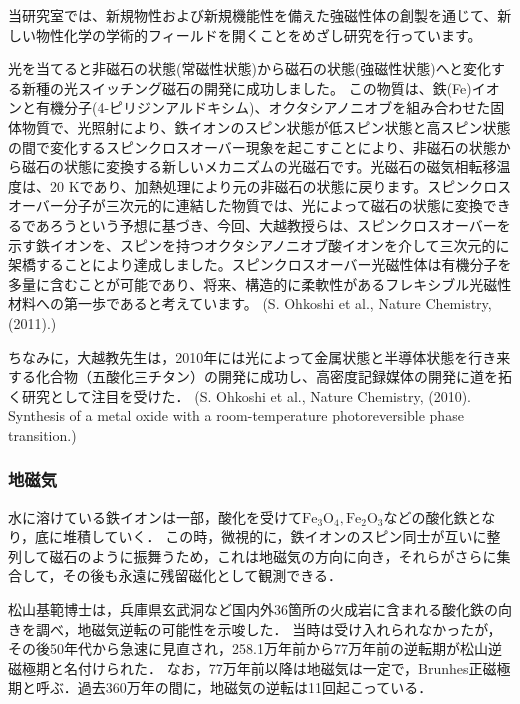 \documentclass[uplatex, dvipdfmx]{jsreport}
\begin{document}
\begin{example}[大越慎一研究室]
    当研究室では、新規物性および新規機能性を備えた強磁性体の創製を通じて、新しい物性化学の学術的フィールドを開くことをめざし研究を行っています。

    光を当てると非磁石の状態(常磁性状態)から磁石の状態(強磁性状態)へと変化する新種の光スイッチング磁石の開発に成功しました。
    この物質は、鉄(Fe)イオンと有機分子(4-ピリジンアルドキシム)、オクタシアノニオブを組み合わせた固体物質で、光照射により、鉄イオンのスピン状態が低スピン状態と高スピン状態の間で変化するスピンクロスオーバー現象を起こすことにより、非磁石の状態から磁石の状態に変換する新しいメカニズムの光磁石です。光磁石の磁気相転移温度は、20 Kであり、加熱処理により元の非磁石の状態に戻ります。スピンクロスオーバー分子が三次元的に連結した物質では、光によって磁石の状態に変換できるであろうという予想に基づき、今回、大越教授らは、スピンクロスオーバーを示す鉄イオンを、スピンを持つオクタシアノニオブ酸イオンを介して三次元的に架橋することにより達成しました。スピンクロスオーバー光磁性体は有機分子を多量に含むことが可能であり、将来、構造的に柔軟性があるフレキシブル光磁性材料への第一歩であると考えています。
    (S. Ohkoshi et al., Nature Chemistry, (2011).)

    ちなみに，大越教先生は，2010年には光によって金属状態と半導体状態を行き来する化合物（五酸化三チタン）の開発に成功し、高密度記録媒体の開発に道を拓く研究として注目を受けた．
    (S. Ohkoshi et al., Nature Chemistry, (2010). Synthesis of a metal oxide with a room-temperature photoreversible phase transition.)
\end{example}

\subsubsection{地磁気}

\begin{fact}[松山基範, 1929]
    水に溶けている鉄イオンは一部，酸化を受けて$\mathrm{Fe_3O_4}, \mathrm{Fe_2O_3}$などの酸化鉄となり，底に堆積していく．
    この時，微視的に，鉄イオンのスピン同士が互いに整列して磁石のように振舞うため，これは地磁気の方向に向き，それらがさらに集合して，その後も永遠に残留磁化として観測できる．

    松山基範博士は，兵庫県玄武洞など国内外36箇所の火成岩に含まれる酸化鉄の向きを調べ，地磁気逆転の可能性を示唆した．
    当時は受け入れられなかったが，その後50年代から急速に見直され，258.1万年前から77万年前の逆転期が松山逆磁極期と名付けられた．
    なお，77万年前以降は地磁気は一定で，Brunhes正磁極期と呼ぶ．過去360万年の間に，地磁気の逆転は11回起こっている．
\end{fact}
\end{document}
